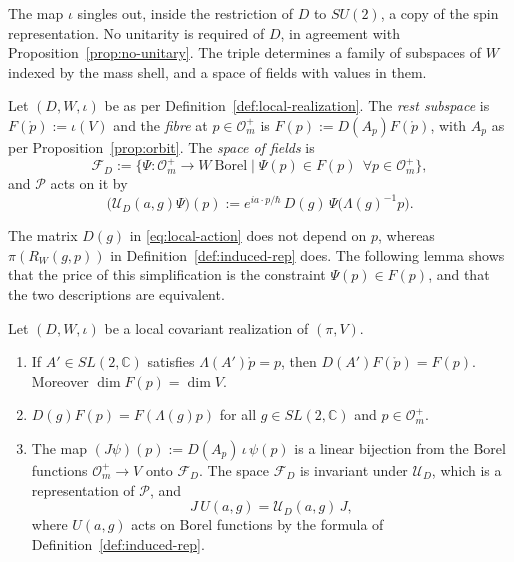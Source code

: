 The map $\iota$ singles out, inside the restriction of $D$ to $SU(2)$, a copy of the spin representation. No unitarity is required of $D$, in agreement with Proposition~\ref{prop:no-unitary}. The triple determines a family of subspaces of $W$ indexed by the mass shell, and a space of fields with values in them.

\begin{definition}\label{def:local-fields}
	Let $(D,W,\iota)$ be as per Definition~\ref{def:local-realization}. The \emph{rest subspace} is $F(\mathring{p}):=\iota(V)$ and the \emph{fibre} at $p\in\mathcal{O}_m^+$ is $F(p):=D(A_p)F(\mathring{p})$, with $A_p$ as per Proposition~\ref{prop:orbit}. The \emph{space of fields} is
	\begin{equation*}
		\mathcal{F}_D:=\{\Psi:\mathcal{O}_m^+\to W\ \text{Borel}\mid\Psi(p)\in F(p)\ \ \forall p\in\mathcal{O}_m^+\},
	\end{equation*}
	and $\mathcal{P}$ acts on it by
	\begin{equation}\label{eq:local-action}
		\big(\mathcal{U}_D(a,g)\Psi\big)(p):=e^{ia\cdot p/\hbar}\,D(g)\,\Psi\big(\Lambda(g)^{-1}p\big).
	\end{equation}
\end{definition}

The matrix $D(g)$ in \eqref{eq:local-action} does not depend on $p$, whereas $\pi(R_W(g,p))$ in Definition~\ref{def:induced-rep} does. The following lemma shows that the price of this simplification is the constraint $\Psi(p)\in F(p)$, and that the two descriptions are equivalent.

\begin{lemma}\label{lem:local-realization}
	Let $(D,W,\iota)$ be a local covariant realization of $(\pi,V)$.
	\begin{enumerate}
		\item If $A'\in SL(2,\mathbb{C})$ satisfies $\Lambda(A')\mathring{p}=p$, then $D(A')F(\mathring{p})=F(p)$. Moreover $\dim F(p)=\dim V$.
		\item $D(g)F(p)=F(\Lambda(g)p)$ for all $g\in SL(2,\mathbb{C})$ and $p\in\mathcal{O}_m^+$.
		\item The map $(J\psi)(p):=D(A_p)\,\iota\,\psi(p)$ is a linear bijection from the Borel functions $\mathcal{O}_m^+\to V$ onto $\mathcal{F}_D$. The space $\mathcal{F}_D$ is invariant under $\mathcal{U}_D$, which is a representation of $\mathcal{P}$, and
		\begin{equation}\label{eq:J-intertwines}
			J\,U(a,g)=\mathcal{U}_D(a,g)\,J,
		\end{equation}
		where $U(a,g)$ acts on Borel functions by the formula of Definition~\ref{def:induced-rep}.
	\end{enumerate}
\end{lemma}

